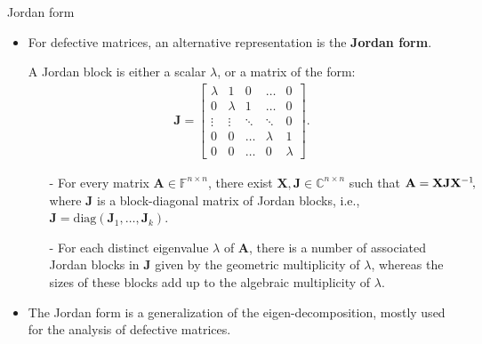 \documentclass[t,usepdftitle=false]{beamer}
\begin{document}
\begin{frame}{Jordan form}
\vspace{-.1cm}
\begin{itemize}
\item For defective matrices, an alternative representation is the \textbf{Jordan form}.\vspace{-.12cm}
\begin{definition}
A Jordan block is either a scalar $\lambda$, or a matrix of the form:\vspace{-.25cm}
{\small
\begin{align*}
\mathbf{J} = 
\begin{bmatrix}
\lambda & 1 & 0 & \dots & 0 \\ 
0 & \lambda & 1 & \dots & 0 \\ 
\vdots & \vdots & \ddots & \ddots & 0 
\\ 0 & 0 & \dots & \lambda & 1 \\ 
0 & 0 & \dots & 0 & \lambda 
\end{bmatrix}.
\end{align*}}
\end{definition}
\vspace{-.12cm}
\begin{theorem}
\begin{itemize}
\item[-] For every matrix $\mathbf{A}\in\mathbb{F}^{n\times n}$, there exist $\mathbf{X},\mathbf{J}\in\mathbb{C}^{n\times n}$ such that $\mathbf{A}=\mathbf{X}\mathbf{J}\mathbf{X}^{-1}\!,\hspace{-1cm}$\\ 
where $\mathbf{J}$ is a block-diagonal matrix of Jordan blocks, i.e., $\mathbf{J}=\mathrm{diag}(\mathbf{J}_1,\dots,\mathbf{J}_k)$.\vspace{-.2cm}
\item[-] For each distinct eigenvalue $\lambda$ of $\mathbf{A}$, there is a number of associated Jordan blocks in $\mathbf{J}$ given by the geometric multiplicity of $\lambda$, whereas the sizes of these blocks add up to the algebraic multiplicity of $\lambda$.
\end{itemize}
\end{theorem}
\vspace{-.12cm}
\item The Jordan form is a generalization of the eigen-decomposition, mostly used for the analysis of defective matrices.
\end{itemize}
\end{frame}
\end{document}
